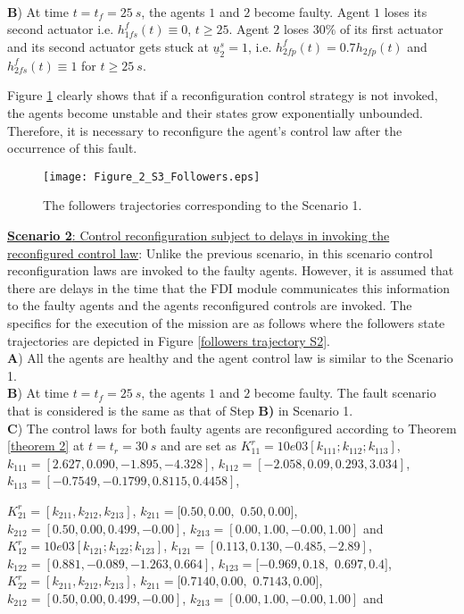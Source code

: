 \documentclass[12pt,draftcls,onecolumn]{IEEEtran}
\begin{document}
 \\
\textbf{B}) At time $t=t_f=25 \ s$, the agents $1$ and $2$ become faulty. Agent $1$ loses its second actuator i.e. $h_{1fs}^f(t)\equiv 0$, $t\geq25$. Agent $2$ loses $30\%$ of its first actuator and its second actuator gets stuck at $\underline{u}_2^{s}=1$, i.e. $h_{2fp}^f(t)= 0.7h_{2fp}(t) $ and $h_{2fs}^f(t)\equiv 1$ for $t\geq25 \ s$.\par
 Figure \ref{followers trajectory S1} clearly shows that  if a reconfiguration control strategy is not invoked, the agents become unstable and their states grow exponentially unbounded. Therefore, it is necessary to reconfigure the agent's control law after the occurrence of this fault. \par 
      \begin{figure}[thpb]
      \centering
                  \texttt{[image: Figure\_2\_S3\_Followers.eps]}
      \caption{The  followers trajectories corresponding to the Scenario 1.}     
      \label{followers trajectory S1}
   \end{figure} 
\underline{\textbf{ Scenario 2}: Control reconfiguration subject to delays in invoking the reconfigured control law}: Unlike the previous scenario, in this scenario  control reconfiguration laws are invoked to the faulty agents. However, 
   it is assumed that there are delays in the time that the FDI module communicates this information to the faulty agents and the agents reconfigured controls are invoked.  
  The specifics for the execution of the mission  are as follows where the followers state trajectories are depicted in Figure \ref{followers trajectory S2}. \\
\textbf{A}) All the agents are healthy and the agent control law is similar to the Scenario 1.  \\
\textbf{B}) At time $t=t_f=25 \ s$, the agents $1$ and $2$ become faulty. The fault scenario that is considered is the same as that of  Step \textbf{B)} in Scenario 1. \\
\textbf{C}) The control laws for both faulty agents are reconfigured according to  Theorem \ref{theorem 2} at $t=t_r=30\ s$ and are set as 
$K_{11}^r=10e03  [k_{111};k_{112};k_{113}]$, 
$k_{111}=[ 2.627  , 0.090 ,  -1.895  , -4.328]$, $k_{112}=[-2.058 ,   0.09  ,  0.293   , 3.034]$, 
   $k_{113}=[-0.7549 ,  -0.1799  , 0.8115  , 0.4458]$,  
   
$K_{21}^r=[k_{211},k_{212},k_{213}]$, 
   $k_{211}=[ 0.50,0.00,$ $0.50 ,0.00]$, $k_{212}=[ 0.50,0.00,0.499,-0.00]$, $k_{213}=[ 0.00,1.00, -0.00,1.00]$ and 
   $K_{12}^r=10e03[k_{121};k_{122};k_{123}]$, 
   $k_{121}=[  0.113  ,  0.130  , -0.485  , -2.89]$, 
    $k_{122}=[0.881 , -0.089 ,  -1.263  , 0.664]$, 
    $k_{123}=[-0.969  ,  0.18,$ $ 0.697  ,  0.4]$, 
  $K_{22}^r=[k_{211},k_{212},k_{213}]$, 
   $k_{211}=[ 0.7140,0.00,$ $0.7143 ,0.00]$, $k_{212}=[ 0.50,0.00,0.499,-0.00]$, $k_{213}=[ 0.00,1.00, -0.00,1.00]$ and 
 
\end{document}
